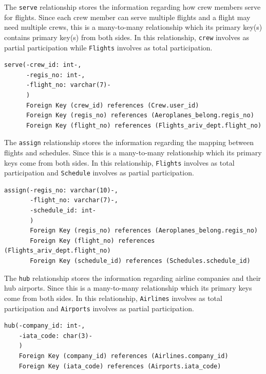 \documentclass{article}
\begin{document}
	
	\noindent The \texttt{serve} relationship stores the information regarding how crew members serve for flights. Since each crew member can serve multiple flights and a flight may need multiple crews, this is a many-to-many relationship which its primary key(s) contains primary key(s) from both sides. In this relationship, \texttt{crew} involves as partial participation while \texttt{Flights} involves as total participation. 
	\begin{lstlisting}[keepspaces=true]        
serve(-crew_id: int-, 
      -regis_no: int-, 
      -flight_no: varchar(7)-
      )
      Foreign Key (crew_id) references (Crew.user_id)
      Foreign Key (regis_no) references (Aeroplanes_belong.regis_no)
      Foreign Key (flight_no) references (Flights_ariv_dept.flight_no)
	\end{lstlisting}    

	\noindent The \texttt{assign} relationship stores the information regarding the mapping between flights and schedules. Since this is a many-to-many relationship which its primary keys come from both sides. In this relationship, \texttt{Flights} involves as total participation and \texttt{Schedule} involves as partial participation.
	\begin{lstlisting}[keepspaces=true]		
assign(-regis_no: varchar(10)-,
       -flight_no: varchar(7)-,
       -schedule_id: int-
       )
       Foreign Key (regis_no) references (Aeroplanes_belong.regis_no)
       Foreign Key (flight_no) references (Flights_ariv_dept.flight_no)
       Foreign Key (schedule_id) references (Schedules.schedule_id)
	\end{lstlisting}    
	
	\noindent The \texttt{hub} relationship stores the information regarding airline companies and their hub airports. Since this is a many-to-many relationship which its primary keys come from both sides. In this relationship, \texttt{Airlines} involves as total participation and \texttt{Airports} involves as partial participation.
	\begin{lstlisting}[keepspaces=true]	
hub(-company_id: int-,
    -iata_code: char(3)-
    )
    Foreign Key (company_id) references (Airlines.company_id)
    Foreign Key (iata_code) references (Airports.iata_code)
	\end{lstlisting}    
	
\end{document}
